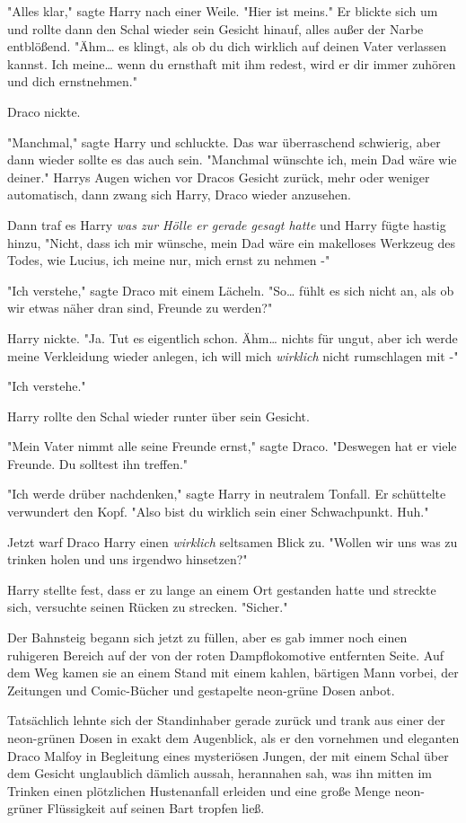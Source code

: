 {"Alles klar," sagte Harry nach einer Weile. "Hier ist meins." Er blickte sich um und rollte dann den Schal wieder sein Gesicht hinauf, alles außer der Narbe entblößend. "Ähm… es klingt, als ob du dich wirklich auf deinen Vater verlassen kannst. Ich meine… wenn du ernsthaft mit ihm redest, wird er dir immer zuhören und dich ernstnehmen."

Draco nickte.

"Manchmal," sagte Harry und schluckte. Das war überraschend schwierig, aber dann wieder sollte es das auch sein. "Manchmal wünschte ich, mein Dad wäre wie deiner." Harrys Augen wichen vor Dracos Gesicht zurück, mehr oder weniger automatisch, dann zwang sich Harry, Draco wieder anzusehen.

Dann traf es Harry \emph{was zur Hölle er gerade gesagt hatte} und Harry fügte hastig hinzu, "Nicht, dass ich mir wünsche, mein Dad wäre ein makelloses Werkzeug des Todes, wie Lucius, ich meine nur, mich ernst zu nehmen -"

"Ich verstehe," sagte Draco mit einem Lächeln. "So… fühlt es sich nicht an, als ob wir etwas näher dran sind, Freunde zu werden?"

Harry nickte. "Ja. Tut es eigentlich schon. Ähm… nichts für ungut, aber ich werde meine Verkleidung wieder anlegen, ich will mich \emph{wirklich} nicht rumschlagen mit -"

"Ich verstehe."

Harry rollte den Schal wieder runter über sein Gesicht.

"Mein Vater nimmt alle seine Freunde ernst," sagte Draco. "Deswegen hat er viele Freunde. Du solltest ihn treffen."

"Ich werde drüber nachdenken," sagte Harry in neutralem Tonfall. Er schüttelte verwundert den Kopf. "Also bist du wirklich sein einer Schwachpunkt. Huh."

Jetzt warf Draco Harry einen \emph{wirklich} seltsamen Blick zu. "Wollen wir uns was zu trinken holen und uns irgendwo hinsetzen?"

Harry stellte fest, dass er zu lange an einem Ort gestanden hatte und streckte sich, versuchte seinen Rücken zu strecken. "Sicher."

Der Bahnsteig begann sich jetzt zu füllen, aber es gab immer noch einen ruhigeren Bereich auf der von der roten Dampflokomotive entfernten Seite. Auf dem Weg kamen sie an einem Stand mit einem kahlen, bärtigen Mann vorbei, der Zeitungen und Comic-Bücher und gestapelte neon-grüne Dosen anbot.

Tatsächlich lehnte sich der Standinhaber gerade zurück und trank aus einer der neon-grünen Dosen in exakt dem Augenblick, als er den vornehmen und eleganten Draco Malfoy in Begleitung eines mysteriösen Jungen, der mit einem Schal über dem Gesicht unglaublich dämlich aussah, herannahen sah, was ihn mitten im Trinken einen plötzlichen Hustenanfall erleiden und eine große Menge neon-grüner Flüssigkeit auf seinen Bart tropfen ließ.

}
